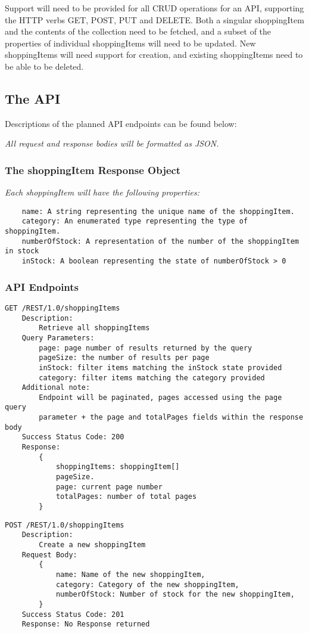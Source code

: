 Support will need to be provided for all CRUD operations for an API, supporting the HTTP verbs GET, POST, PUT and DELETE. Both a singular shoppingItem and the contents of the collection need to be fetched, and a subset of the properties of individual shoppingItems will need to be updated. New shoppingItems will need support for creation, and existing shoppingItems need to be able to be deleted.

\subsection{The API}
Descriptions of the planned API endpoints can be found below:

\emph{All request and response bodies will be formatted as JSON.}

\subsubsection{The shoppingItem Response Object}
\emph{Each shoppingItem will have the following properties:}
\begin{verbatim}
    name: A string representing the unique name of the shoppingItem.
    category: An enumerated type representing the type of shoppingItem.
    numberOfStock: A representation of the number of the shoppingItem in stock
    inStock: A boolean representing the state of numberOfStock > 0
\end{verbatim}
\subsubsection{API Endpoints}
\begin{verbatim}
GET /REST/1.0/shoppingItems
    Description:
        Retrieve all shoppingItems
    Query Parameters:
        page: page number of results returned by the query
        pageSize: the number of results per page
        inStock: filter items matching the inStock state provided
        category: filter items matching the category provided
    Additional note:
        Endpoint will be paginated, pages accessed using the page query 
        parameter + the page and totalPages fields within the response body
    Success Status Code: 200
    Response: 
        {
            shoppingItems: shoppingItem[]
            pageSize.
            page: current page number
            totalPages: number of total pages
        }
\end{verbatim}\medskip

\begin{verbatim}
POST /REST/1.0/shoppingItems
    Description:
        Create a new shoppingItem
    Request Body:
        {
            name: Name of the new shoppingItem,
            category: Category of the new shoppingItem,
            numberOfStock: Number of stock for the new shoppingItem,
        }
    Success Status Code: 201
    Response: No Response returned
\end{verbatim}\medskip

